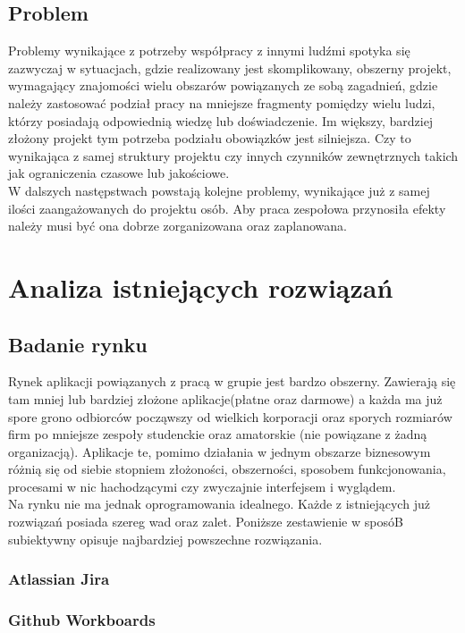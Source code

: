 \documentclass[eng,printmode]{mgr}
\begin{document}
\section{Problem}
Problemy wynikające z potrzeby współpracy z innymi ludźmi spotyka się zazwyczaj w sytuacjach, gdzie realizowany jest skomplikowany, obszerny projekt, wymagający znajomości wielu obszarów powiązanych ze sobą zagadnień, gdzie należy zastosować podział pracy na mniejsze fragmenty pomiędzy wielu ludzi, którzy posiadają odpowiednią wiedzę lub doświadczenie. Im większy, bardziej złożony projekt tym potrzeba podziału obowiązków jest silniejsza. Czy to wynikająca z samej struktury projektu czy innych czynników zewnętrznych takich jak ograniczenia czasowe lub jakościowe. \\
W dalszych następstwach powstają kolejne problemy, wynikające już z samej ilości zaangażowanych do projektu osób. Aby praca zespołowa przynosiła efekty należy musi być ona dobrze zorganizowana oraz zaplanowana.
\chapter{Analiza istniejących rozwiązań}  
\section{Badanie rynku}
Rynek aplikacji powiązanych z pracą w grupie jest bardzo obszerny. Zawierają się tam mniej lub bardziej złożone aplikacje(płatne oraz darmowe) a każda ma już spore grono odbiorców począwszy od wielkich korporacji oraz sporych rozmiarów firm po mniejsze zespoły studenckie oraz amatorskie (nie powiązane z żadną organizacją). Aplikacje te, pomimo działania w jednym obszarze biznesowym różnią się od siebie stopniem złożoności, obszerności, sposobem funkcjonowania, procesami w nic hachodzącymi czy zwyczajnie interfejsem i wyglądem.\\
Na rynku nie ma jednak oprogramowania idealnego. Każde z istniejących już rozwiązań posiada szereg wad oraz zalet. Poniższe zestawienie w sposóB subiektywny opisuje najbardziej powszechne rozwiązania.
\subsection{Atlassian Jira}

\subsection{Github Workboards}
\end{document}
